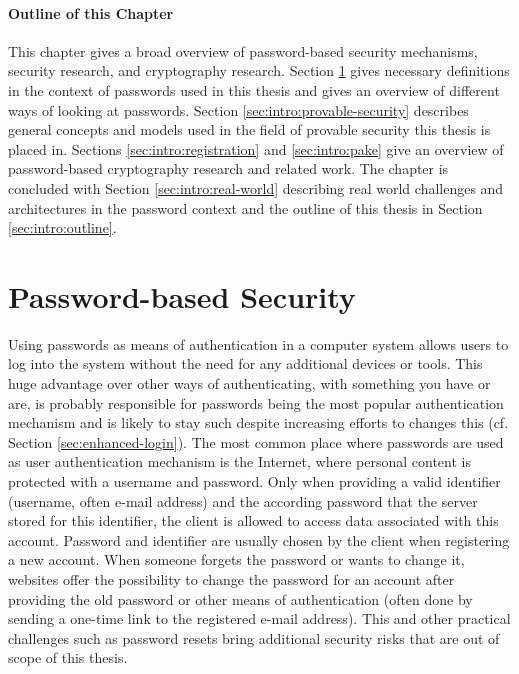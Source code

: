 \paragraph{Outline of this Chapter}
This chapter gives a broad overview of password-based security mechanisms, security research, and cryptography research.
Section \ref{sec:intro:pwd-security} gives necessary definitions in the context of passwords used in this thesis and gives an overview of different ways of looking at passwords.
Section \ref{sec:intro:provable-security} describes general concepts and models used in the field of provable security this thesis is placed in.
Sections \ref{sec:intro:registration} and \ref{sec:intro:pake} give an overview of password-based cryptography research and related work.
The chapter is concluded with Section \ref{sec:intro:real-world} describing real world challenges and architectures in the password context and the outline of this thesis in Section \ref{sec:intro:outline}.


\section{Password-based Security} \label{sec:intro:pwd-security}
Using passwords as means of authentication in a computer system allows users to log into the system without the need for any additional devices or tools.
This huge advantage over other ways of authenticating, \ie with something you have or are, is probably responsible for passwords being the most popular authentication mechanism and is likely to stay such despite increasing efforts to changes this (cf. Section \ref{sec:enhanced-login}).
The most common place where passwords are used as user authentication mechanism is the Internet, where personal content is protected with a username and password.
Only when providing a valid identifier (username, often e-mail address) and the according password that the server stored for this identifier, the client is allowed to access data associated with this account.
Password and identifier are usually chosen by the client when registering a new account.
When someone forgets the password or wants to change it, websites offer the possibility to change the password for an account after providing the old password or other means of authentication (often done by sending a one-time link to the registered e-mail address).
This and other practical challenges such as password resets bring additional security risks that are out of scope of this thesis.

